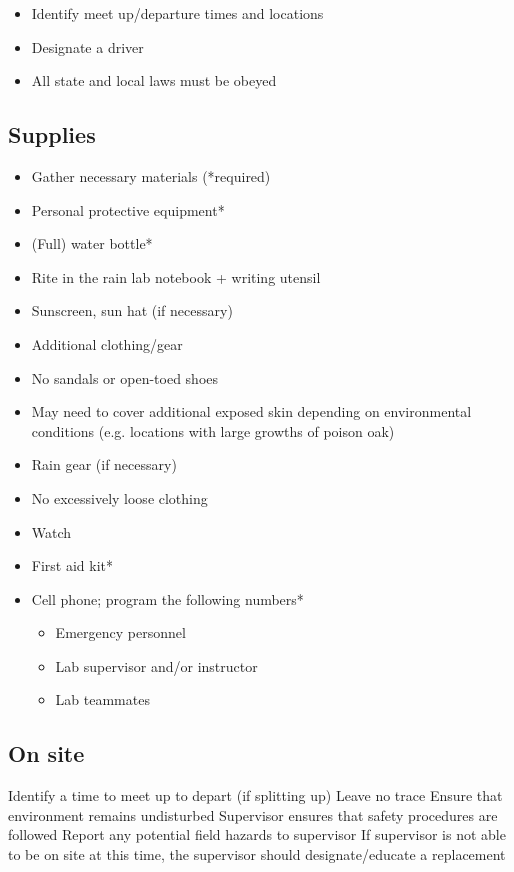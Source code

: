 \documentclass[12pt]{../SOP2}
\begin{document}
\begin{itemize}
  \item Identify meet up/departure times and locations
  \item Designate a driver
  \item All state and local laws must be obeyed
\end{itemize}

\subsection{Supplies}

\begin{itemize}
  \item Gather necessary materials (*required)
  \item Personal protective equipment*
  \item (Full) water bottle*
  \item Rite in the rain lab notebook + writing utensil
  \item Sunscreen, sun hat (if necessary)
  \item Additional clothing/gear
  \item No sandals or open-toed shoes
  \item May need to cover additional exposed skin depending on environmental conditions (e.g. locations with large growths of poison oak)
  \item Rain gear (if necessary)
  \item No excessively loose clothing
  \item Watch
  \item First aid kit*
  \item Cell phone; program the following numbers*
\begin{itemize}
  \item Emergency personnel
  \item Lab supervisor and/or instructor
  \item Lab teammates
\end{itemize}
\end{itemize}

\subsection{On site}

Identify a time to meet up to depart (if splitting up)
Leave no trace
Ensure that environment remains undisturbed
Supervisor ensures that safety procedures are followed
Report any potential field hazards to supervisor
If supervisor is not able to be on site at this time, the supervisor should designate/educate a replacement
\end{document}

